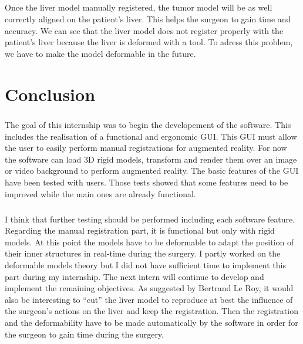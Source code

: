\documentclass[12pt]{report}
\begin{document}
\paragraph{}
 Once the liver model manually registered, the tumor model will be as well correctly aligned on the patient's liver. This helps the surgeon to gain time and accuracy. We can see that the liver model does not register properly with the patient's liver because the liver is deformed with a tool. To adress this problem, we have to make the model deformable in the future.
 

\chapter{Conclusion} \label{sec:conclusion} 
\paragraph{}
The goal of this internship was to begin the developement of the software. This includes the realisation of a functional and ergonomic GUI. This GUI must allow the user to easily perform manual registrations for augmented reality. For now the software can load 3D rigid models, transform and render them over an image or video background to perform augmented reality. The basic features of the GUI have been tested with users. Those tests showed that some features need to be improved while the main ones are already functional.

\paragraph{}
I think that further testing should be performed including each software feature. Regarding the manual registration part, it is functional but only with rigid models. At this point the models have to be deformable to adapt the position of their inner structures in real-time during the surgery. I partly worked on the deformable models theory but I did not have sufficient time to implement this part during my internship. The next intern will continue to develop and implement the remaining objectives. As suggested by Bertrand Le Roy, it would also be interesting to ``cut'' the liver model to reproduce at best the influence of the surgeon's actions on the liver and keep the registration. Then the registration and the deformability have to be made automatically by the software in order for the surgeon to gain time during the surgery.
\end{document}
